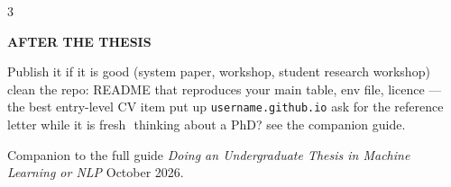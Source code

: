 \documentclass[10pt,a4paper]{article}
\newcommand{\head}[1]{%
  \vspace{4.5pt}{\color{brand}\rule{\linewidth}{0.9pt}}\par\vspace{1.5pt}%
  {\bfseries\color{brand}\MakeUppercase{#1}}\par\vspace{2pt}}
\newcommand{\code}[1]{\texttt{#1}}
\newcommand{\dt}{\,\textperiodcentered\,\allowbreak}
\begin{document}
\begin{multicols}{3}
\head{After the thesis}
Publish it if it is good (system paper, workshop, student research
workshop)\dt clean the repo: README that reproduces your main table, env file,
licence --- the best entry-level CV item\dt put up
\code{username.github.io}\dt ask for the reference letter while it is fresh\dt
thinking about a PhD? see the companion guide.

\vspace{2pt}
{\color{mutegray}Companion to the full guide \emph{Doing an Undergraduate
Thesis in Machine Learning or NLP}\dt October 2026.}

\end{multicols}
\end{document}
